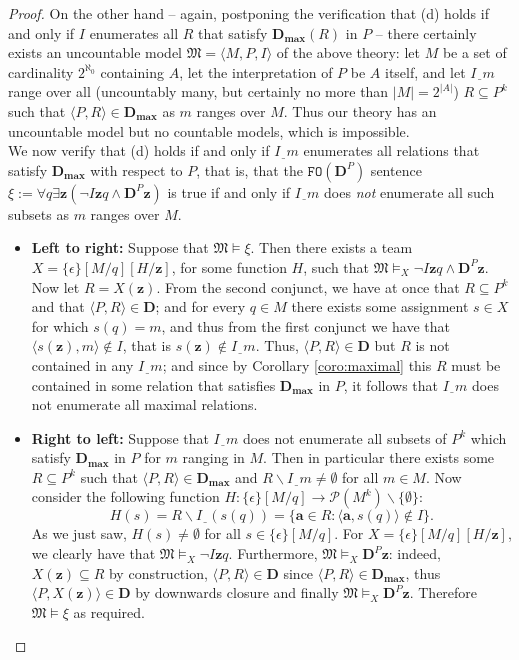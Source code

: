 \documentclass{article}
\theoremstyle{definition}
\newcommand{\tuple}{\mathbf}
\newcommand{\FO}{\texttt{FO}}
\newcommand{\M}{\mathfrak M}
\newcommand{\D}{\mathbf D}
\newcommand{\parts}{\mathcal P}
\newcommand{\Dmax}{\mathbf D_{\textbf{max}}}
\newcommand{\h}{\underline{~~}}
\begin{document}
\begin{proof}
	On the other hand -- again, postponing the verification that (d) holds if and only if $I$ enumerates all $R$ that satisfy $\Dmax(R)$ in $P$ -- there certainly exists an uncountable model $\M = \langle M, P, I\rangle$ of the above theory: let $M$ be a set of cardinality $2^{\aleph_0}$ containing $A$, let the interpretation of $P$ be $A$ itself, and let $I\h m$ range over all (uncountably many, but certainly no more than $|M| = 2^{|A|}$) $R \subseteq P^k$ such that $\langle P, R\rangle \in \Dmax$ as $m$ ranges over $M$. Thus our theory has an uncountable model but no countable models, which is impossible.\\

	We now verify that (d) holds if and only if $I\h m$ enumerates all relations that satisfy $\Dmax$ with respect to $P$, that is, that the $\FO(\D^P)$ sentence $\xi := \forall q \exists \tuple z( \lnot I \tuple z q \wedge \D^P \tuple z)$ is true if and only if $I\h m$ does \emph{not} enumerate all such subsets as $m$ ranges over $M$. 

	\begin{itemize}
		\item \textbf{Left to right:} Suppose that $\M \models \xi$. Then there exists a team $X = \{\epsilon\}[M/q][H/\tuple z]$, for some function $H$, such that $\M \models_X \lnot I \tuple z q \wedge \D^P\tuple z$. Now let $R = X(\tuple z)$. From the second conjunct, we have at once that $R \subseteq P^k$ and that $\langle P, R\rangle \in \D$; and for every $q \in M$ there exists some assignment $s \in X$ for which $s(q) = m$, and thus from the first conjunct we have that $\langle s(\tuple z), m\rangle \not \in I$, that is $s(\tuple z) \not \in I\h m$. Thus, $\langle P, R\rangle \in \D$ but $R$ is not contained in any $I \h m$; and since by Corollary \ref{coro:maximal} this $R$ must be contained in some relation that satisfies $\Dmax$ in $P$, it follows that $I\h m$ does not enumerate all maximal relations.

		\item \textbf{Right to left:} Suppose that $I\h m$ does not enumerate all subsets of $P^k$ which satisfy $\Dmax$ in $P$ for $m$ ranging in $M$. Then in particular there exists some $R \subseteq P^k$ such that $\langle P, R\rangle \in \Dmax$ and $R \backslash I\h m \not = \emptyset$ for all $m \in M$. Now consider the following function $H: \{\epsilon\}[M/q] \rightarrow \parts(M^k) \backslash \{\emptyset\}$: 
			\[
				H(s) = R \backslash I \h (s(q)) = \{\tuple a \in R : \langle \tuple a, s(q)\rangle \not \in I\}.
			\]
			As we just saw, $H(s) \not = \emptyset$ for all $s \in \{\epsilon\}[M/q]$. For $X = \{\epsilon\}[M/q][H/\tuple z]$, we clearly have that $\M \models_X \lnot I \tuple z q$. Furthermore, $\M \models_X \D^P \tuple z$: indeed, $X(\tuple z) \subseteq R$ by construction, $\langle P, R\rangle  \in \D$ since $\langle P, R\rangle \in \Dmax$, thus $\langle P, X(\tuple z)\rangle \in \D$ by downwards closure and finally $\M \models_X \D^P \tuple z$. Therefore $\M \models \xi$ as required.
	\end{itemize}
\end{proof}
\end{document}
